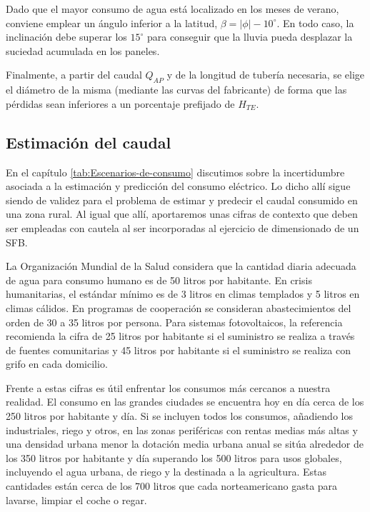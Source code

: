Dado que el mayor consumo de agua está localizado en los meses de
verano, conviene emplear un ángulo inferior a la latitud,
$\beta=|\phi|-10^{\circ}$.  En todo caso, la inclinación debe superar
los $15^{\circ}$ para conseguir que la lluvia pueda desplazar la
suciedad acumulada en los paneles.

Finalmente, a partir del caudal $Q_{AP}$ y de la longitud de tubería
necesaria, se elige el diámetro de la misma (mediante las curvas del
fabricante) de forma que las pérdidas sean inferiores a un porcentaje
prefijado de $H_{TE}$.


\subsection{Estimación del caudal}

En el capítulo \ref{tab:Escenarios-de-consumo} discutimos sobre la
incertidumbre asociada a la estimación y predicción del consumo eléctrico.
Lo dicho allí sigue siendo de validez para el problema de estimar
y predecir el caudal consumido en una zona rural. Al igual que allí,
aportaremos unas cifras de contexto que deben ser empleadas con cautela
al ser incorporadas al ejercicio de dimensionado de un SFB. 

La Organización Mundial de la Salud considera que la cantidad diaria
adecuada de agua para consumo humano es de 50 litros por habitante.
En crisis humanitarias, el estándar mínimo es de 3 litros en climas
templados y 5 litros en climas cálidos. En programas de cooperación
se consideran abastecimientos del orden de 30 a 35 litros por persona.
Para sistemas fotovoltaicos, la referencia \citep{Narvarte.Lorenzo2006}
recomienda la cifra de 25 litros por habitante si el suministro se
realiza a través de fuentes comunitarias y 45 litros por habitante
si el suministro se realiza con grifo en cada domicilio.

Frente a estas cifras es útil enfrentar los consumos más cercanos
a nuestra realidad. El consumo en las grandes ciudades se encuentra
hoy en día cerca de los 250 litros por habitante y día. Si se incluyen
todos los consumos, añadiendo los industriales, riego y otros, en
las zonas periféricas con rentas medias más altas y una densidad urbana
menor la dotación media urbana anual se sitúa alrededor de los 350
litros por habitante y día superando los 500 litros para usos globales,
incluyendo el agua urbana, de riego y la destinada a la agricultura.
Estas cantidades están cerca de los 700 litros que cada norteamericano
gasta para lavarse, limpiar el coche o regar.

